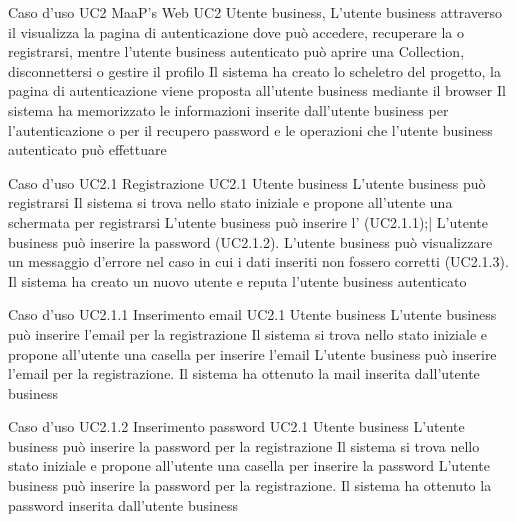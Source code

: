 \UCtitle
{Caso d'uso UC2}
{MaaP's Web}
\UC
{UC2}
{Utente business, }
{L'utente business attraverso il  visualizza la pagina di autenticazione dove può accedere, recuperare la  o registrarsi, mentre l'utente business autenticato può aprire una Collection, disconnettersi o gestire il profilo}
{Il sistema ha creato lo scheletro del progetto, la pagina di autenticazione viene proposta all'utente business mediante il browser}
\post
{Il sistema ha memorizzato le informazioni inserite dall'utente business per l'autenticazione o per il recupero password e le operazioni che l'utente business autenticato può effettuare}



\UCtitle
{Caso d'uso UC2.1}
{Registrazione}
\UC
{UC2.1}
{Utente business}
{L'utente business può registrarsi}
{Il sistema si trova nello stato iniziale e propone all'utente una schermata per registrarsi}
\scenario
{
L'utente business può inserire l' (UC2.1.1);|
L'utente business può inserire la password (UC2.1.2).
}
\scenarioAlt
{
L'utente business può visualizzare un messaggio d'errore nel caso in cui i dati inseriti non fossero corretti (UC2.1.3).
}
\post
{Il sistema ha creato un nuovo utente e reputa l'utente business autenticato}

\UCtitle
{Caso d'uso UC2.1.1}
{Inserimento email}
\UC
{UC2.1}
{Utente business}
{L'utente business può inserire l'email per la registrazione}
{Il sistema si trova nello stato iniziale e propone all'utente una casella per inserire l'email}
\scenario
{L'utente business può inserire l'email per la registrazione.}
\post
{Il sistema ha ottenuto la mail inserita dall'utente business}

\UCtitle
{Caso d'uso UC2.1.2}
{Inserimento password}
\UC
{UC2.1}
{Utente business}
{L'utente business può inserire la password per la registrazione}
{Il sistema si trova nello stato iniziale e propone all'utente una casella per inserire la password}
\scenario
{L'utente business può inserire la password per la registrazione.}
\post
{Il sistema ha ottenuto la password inserita dall'utente business}

